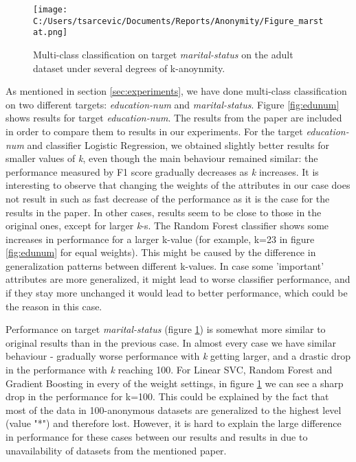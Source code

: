 \documentclass{article}
\begin{document}
\begin{figure}
	\texttt{[image: C:/Users/tsarcevic/Documents/Reports/Anonymity/Figure\_marstat.png]}
	\caption{Multi-class classification on target \textit{marital-status} on the adult dataset under several degrees of k-anoynmity.}
 	\label{fig:marstat}
\end{figure}

As mentioned in section \ref{sec:experiments}, we have done multi-class classification on two different targets: \textit{education-num} and \textit{marital-status}. Figure \ref{fig:edunum} shows results for target \textit{education-num}. The results from the paper \cite{malle2017not} are included in order to compare them to results in our experiments. For the target \textit{education-num} and classifier Logistic Regression, we obtained slightly better results for smaller values of \textit{k}, even though the main behaviour remained similar: the performance measured by F1 score gradually decreases as \textit{k} increases. It is interesting to observe that changing the weights of the attributes in our case does not result in such as fast decrease of the performance as it is the case for the results in the paper. In other cases, results seem to be close to those in the original ones, except for larger \textit{k}-s. The Random Forest classifier shows some increases in performance for a larger k-value (for example, k=23 in figure \ref{fig:edunum} for equal weights). This might be caused by the difference in generalization patterns between different k-values.  In case some 'important' attributes are more generalized, it might lead to worse classifier performance, and if they stay more unchanged it would lead to better performance, which could be the reason in this case. 

Performance on target \textit{marital-status} (figure \ref{fig:marstat}) is somewhat more similar to original results than in the previous case. In almost every case we have similar behaviour - gradually worse performance with \textit{k} getting larger, and a drastic drop in the performance with \textit{k} reaching 100. For Linear SVC, Random Forest and Gradient Boosting in every of the weight settings, in figure \ref{fig:marstat} we can see a sharp drop in the performance for k=100. This could be explained by the fact that most of the data in 100-anonymous datasets are generalized to the highest level (value "*") and therefore lost. However, it is hard to explain the large difference in performance for these cases between our results and results in \cite{malle2017not} due to unavailability of datasets from the mentioned paper.
\end{document}

